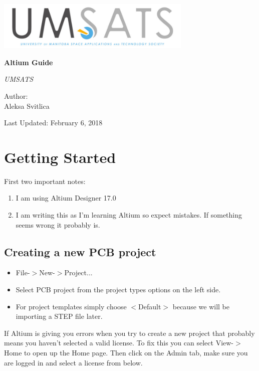 \documentclass{article}
\begin{document}
	\begin{titlepage}
		\centering
		\includegraphics[width=0.7\textwidth]{"logo"}\par\vspace{1cm}

		\vspace{1cm}

		\vspace{1.5cm}
		{\huge\bfseries Altium Guide\par}
		\vspace{2cm}
		{\Large\itshape UMSATS\par}
		\vfill

		Author:\\ Aleksa Svitlica
		\par		
		\vfill
		
		{\large Last Updated: February 6, 2018\par}
	\end{titlepage}
	\tableofcontents
	\newpage
	
	\section{Getting Started}
	First two important notes:
	\begin{enumerate}
		\item I am using Altium Designer 17.0
		\item I am writing this as I'm learning Altium so expect mistakes. If something seems wrong it probably is.
	\end{enumerate}

	\subsection{Creating a new PCB project}
	\begin{itemize}
		\item File-$>$New-$>$Project...
		\item Select PCB project from the project types options on the left side.
		\item For project templates simply choose $<$Default$>$ because we will be importing a STEP file later.
	\end{itemize}
	If Altium is giving you errors when you try to create a new project that probably means you haven't selected a valid license. To fix this you can select View-$>$Home to open up the Home page. Then click on the Admin tab, make sure you are logged in and select a license from below.
\end{document}
